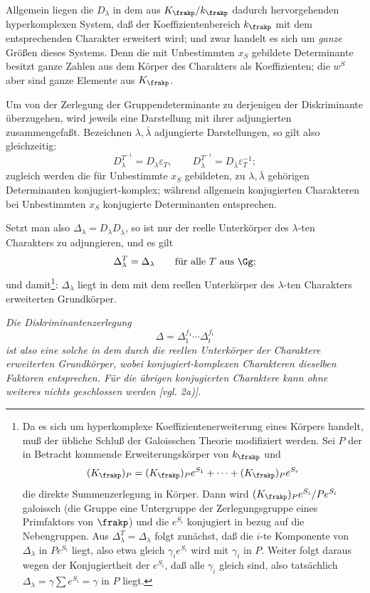 Allgemein liegen die \(D_\lambda\) in dem aus \(K_\frakp/k_\frakp\) dadurch hervorgehenden hyperkomplexen System, daß der Koeffizientenbereich \(k_\frakp\) mit dem entsprechenden Charakter erweitert wird; und zwar handelt es sich um \emph{ganze} Größen dieses Systems. Denn die mit Unbestimmten \(x_S\) gebildete Determinante besitzt ganze Zahlen aus dem Körper des Charakters als Koeffizienten; die \(w^S\) aber sind ganze Elemente aus \(K_\frakp\).

Um von der Zerlegung der Gruppendeterminante zu derjenigen der Diskriminante überzugehen, wird jeweils eine Darstellung mit ihrer adjungierten zusammengefaßt. Bezeichnen \(\lambda,\bar\lambda\) adjungierte Darstellungen, so gilt also gleichzeitig:
\[
        D_\lambda^{T^{-1}}=D_\lambda\varepsilon_T,
        \qquad
        D_{\bar\lambda}^{T^{-1}}=D_{\bar\lambda}\varepsilon_T^{-1};
\]
zugleich werden die für Unbestimmte \(x_S\) gebildeten, zu \(\lambda,\bar\lambda\) gehörigen Determinanten konjugiert-komplex; während allgemein konjugierten Charakteren bei Unbestimmten \(x_S\) konjugierte Determinanten entsprechen.

Setzt man also \(\Delta_\lambda=D_\lambda D_{\bar\lambda}\), so ist nur der reelle Unterkörper des \(\lambda\)-ten Charakters zu adjungieren, und es gilt
\[
        \Delta_\lambda^T=\Delta_\lambda
        \qquad\hbox{für alle }T\hbox{ aus }\Gg;
\]
und damit\footnote{Da es sich um hyperkomplexe Koeffizientenerweiterung eines Körpers handelt, muß der übliche Schluß der Galoisschen Theorie modifiziert werden. Sei \(P\) der in Betracht kommende Erweiterungskörper von \(k_\frakp\) und
\[
        (K_\frakp)_P=(K_\frakp)_P e^{S_1}+\cdots+(K_\frakp)_P e^{S_r}
\]
die direkte Summenzerlegung in Körper. Dann wird \( (K_\frakp)_P e^{S_i}/Pe^{S_i}\) galoissch (die Gruppe eine Untergruppe der Zerlegungsgruppe eines Primfaktors von \(\frakp\)) und die \(e^{S_i}\) konjugiert in bezug auf die Nebengruppen. Aus \(\Delta_\lambda^T=\Delta_\lambda\) folgt zunächst, daß die \(i\)-te Komponente von \(\Delta_\lambda\) in \(Pe^{S_i}\) liegt, also etwa gleich \(\gamma_i e^{S_i}\) wird mit \(\gamma_i\) in \(P\). Weiter folgt daraus wegen der Konjugiertheit der \(e^{S_i}\), daß alle \(\gamma_i\) gleich sind, also tatsächlich \(\Delta_\lambda=\gamma\sum e^{S_i}=\gamma\) in \(P\) liegt.}: \(\Delta_\lambda\) liegt in dem mit dem reellen Unterkörper des \(\lambda\)-ten Charakters erweiterten Grundkörper.

\emph{Die Diskriminantenzerlegung}
\[
        \Delta=\Delta_1^{f_1}\cdots\Delta_t^{f_t}
\]
\emph{ist also eine solche in dem durch die reellen Unterkörper der Charaktere erweiterten Grundkörper, wobei konjugiert-komplexen Charakteren dieselben Faktoren entsprechen. Für die übrigen konjugierten Charaktere kann ohne weiteres nichts geschlossen werden [vgl. 2a)].}

